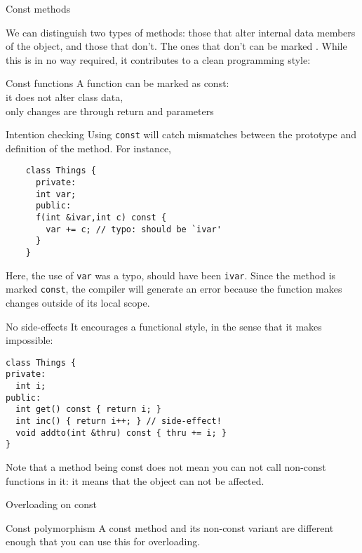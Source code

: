  {Const methods}


We can distinguish two types of methods: those that alter internal
data members of the object, and those that don't. The ones that don't
can be marked .
While this is in no way required, it contributes to a clean
programming style:

\begin{slide}{Const functions}
  \label{sl:const-function}
  A function can be marked as const:\\
  it does not alter class data,\\
  only changes are through return and parameters
\end{slide}

\begin{block}{Intention checking}
  Using \lstinline{const} will catch mismatches between the prototype
  and definition of the method. For instance,
  \begin{lstlisting}
    class Things {
      private:
      int var;
      public:
      f(int &ivar,int c) const {
        var += c; // typo: should be `ivar'
      }
    }
  \end{lstlisting}
\end{block}

Here, the use of \lstinline{var} was a typo, should have been \lstinline{ivar}. Since
the method is marked \lstinline{const}, the compiler will generate an error
because the function makes changes outside of its local scope.

\begin{block}{No side-effects}
  \label{sl:const-sideeffect}
  It encourages a functional style, in the sense that it makes
   impossible:
\begin{lstlisting}
class Things {
private:
  int i;
public:
  int get() const { return i; }
  int inc() { return i++; } // side-effect!
  void addto(int &thru) const { thru += i; }
}
\end{lstlisting}
\end{block}

Note that a method being const does not mean you can not call non-const functions
in it: it means that the  object can not be affected.


 {Overloading on const}
\label{sec:const-overload}

\begin{block}{Const polymorphism}
  \label{sl:const-poly}
  A const method and its non-const variant are different enough that you
  can use this for overloading.
\end{block}

